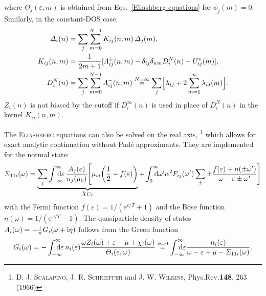 \documentclass[a4paper]{article}
\let\Im\relax
\DeclareMathOperator\Im{Im}
\def\D{\mathrm d}
\def\E{\mathrm e}
\def\I{\mathrm i}
\def\sub#1{\sb{\mathrm{#1}}}
\def\from#1{\sb{\mathrlap{#1}}}
\def\till#1{\sp{\mathrlap{#1}}}
\let\Delta\varDelta
\let\epsilon\varepsilon
\let\Lambda\varLambda
\let\Sigma\varSigma
\let\Theta\varTheta
\newlength\gap
\begin{document}
   where $\Theta_j(\epsilon, m)$ is obtained from Eqs.~\ref{Eliashberg
   equations} for $\phi_j(m) = 0$. Similarly, in the constant-DOS case,
   \begin{equation}
      \begin{split}
         \Delta_i(n) &= \sum_j \sum_{m = 0}^{N - 1}
         K_{i j}(n, m) \, \Delta_j(m),
         \\
         K_{i j}(n, m) &= \frac 1 {2 m + 1} [\Lambda_{i j}^+(n, m)
         - \delta_{i j} \delta_{n m} D_i^N(n) - U^*_{i j}(m)],
         \\
         D_i^N(n) &= \sum_j \sum_{m = 0}^{N - 1} \Lambda_{i j}^-(n, m)
         \overset{N = \infty} =
         \sum_j \Bigl[ \lambda_{i j} + 2 \sum_{m = 1}^n \lambda_{i j}(m) \Bigr].
      \end{split}
      \label{linearized gap equation}
   \end{equation}
   $Z_i(n)$ is not biased by the cutoff if $D_i^\infty(n)$ is used in place of
   $D_i^N(n)$ in the kernel $K_{i j}(n, m)$.

   The \textsc{Eliashberg} equations can also be solved on the real axis,%
   \footnote{%
      D. J. \textsc{Scalapino}, J. R. \textsc{Schrieffer} and J. W.
      \textsc{Wilkins}, Phys.\@  Rev.\@ \textbf{148}, 263 (1966)
      }
   which allows for exact analytic continuation without Padé approximants. They
   are implemented for the normal state:
   \begin{equation}
      \varSigma_{1 1 i}(\omega) = \underbrace{
      \sum_j
      \int \from{-\infty} \till \infty \D \epsilon \,
      \frac{A_j(\epsilon)}{n_j(\mu_0)}
      \Biggl[
         \mu_{i j}
         \biggl( \frac12 - f(\epsilon) \biggr)
            }_{\displaystyle {\chi \sub C}_i}
         + \int \from 0 \till \infty \D \omega'
         \alpha^2 F_{i j}(\omega')
         \sum_\pm \pm \frac{f(\epsilon) + n(\pm \omega')}
            {\omega - \epsilon \pm \omega'}
      \Biggr]
      \label{real-axis equations}
   \end{equation}
   with the Fermi function $f(\epsilon) = 1 / (\E^{\epsilon / T} + 1)$ and the
   Bose function $n(\omega) = 1 / (\E^{\omega / T} - 1)$. The quasiparticle
   density of states $A_i(\omega) = -\frac 1 \pi \Im G_i(\omega + \I \eta)$
   follows from the Green function
   \begin{equation*}
      G_i(\omega) =
      -\int \from{-\infty} \till \infty \D \epsilon \,
      n_i(\epsilon)
      \frac{\omega Z_i(\omega)
         + \epsilon - \mu + \chi_i(\omega)}
         {\Theta_i(\epsilon, \omega)}
      \overset{\phi = 0} =
      \int \from{-\infty} \till \infty \D \epsilon
      \frac{n_i(\epsilon)}
         {\omega - \epsilon + \mu - \Sigma_{1 1 i}(\omega)}.
   \end{equation*}
\end{document}
